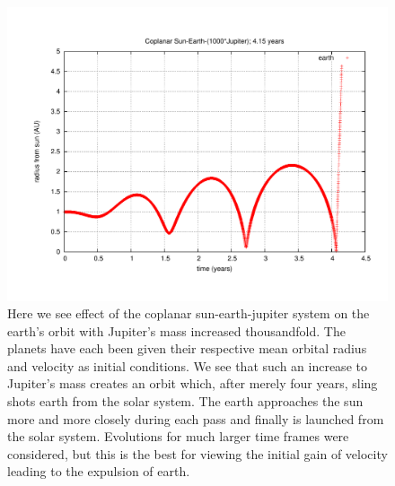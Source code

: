 \documentclass[11pt,a4paper]{article}
\begin{document}
\begin{figure}
\centering
\includegraphics[width=1.0\textwidth]{coplanar_sej1000_radius.pdf}
\caption{Here we see effect of the coplanar sun-earth-jupiter system on the earth's orbit with Jupiter's mass increased thousandfold. The planets have each been given their respective mean orbital radius and velocity as initial conditions. We see that such an increase to Jupiter's mass creates an orbit which, after merely four years, sling shots earth from the solar system. The earth approaches the sun more and more closely during each pass and finally is launched from the solar system. Evolutions for much larger time frames were considered, but this is the best for viewing the initial gain of velocity leading to the expulsion of earth.}
\end{figure}
\end{document}
